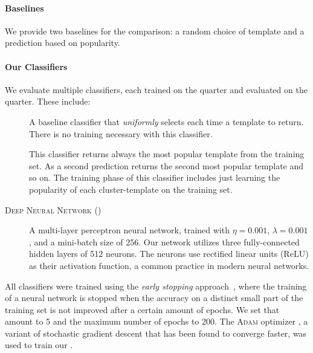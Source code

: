 \paragraph{Baselines}
We provide two baselines for the comparison: a random choice of template and a
prediction based on popularity.

\paragraph{Our Classifiers}
We evaluate multiple classifiers, each trained on the \SPRING quarter and evaluated
on the \FALL quarter. These include:
\begin{description}
  \item[\random] A baseline classifier that \emph{uniformly} selects each time a
    template to return. There is no training necessary with this classifier.
  \item[\popular] This classifier returns always the most popular template from
    the training set. As a second prediction returns the second most popular
    template and so on. The training phase of this classifier includes just
    learning the popularity of each cluster-template on the training set.
  \item[\textsc{Deep Neural Network} (\dnn)] A multi-layer perceptron neural
    network, trained with $\eta = 0.001$, $\lambda = 0.001$, and a mini-batch
    size of 256. Our network utilizes three fully-connected hidden layers of 512
    neurons. The neurons use rectified linear units (ReLU) as their activation
    function, a common practice in modern neural networks.
\end{description}

All classifiers were trained using the \emph{early stopping} approach~\cite{FIXME},
where the
training of a neural network is stopped when the accuracy on a distinct small
part of the training set is not improved after a certain amount of epochs. We
set that amount to 5 and the maximum number of epochs to 200. The \textsc{Adam}
optimizer \citep{Kingma2014-ng}, a variant of stochastic gradient descent that
has been found to converge faster, was used to train our \dnn.




